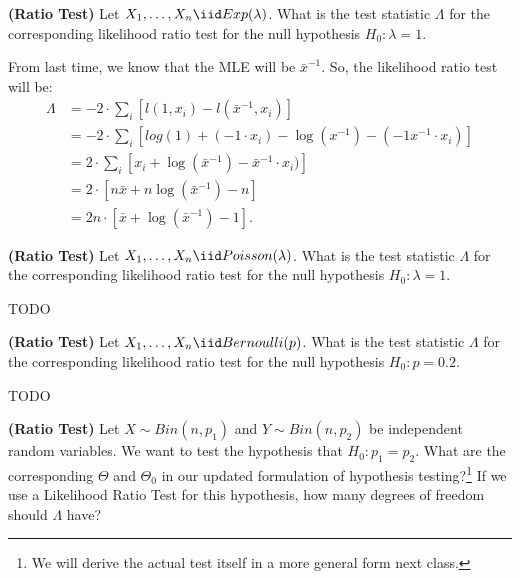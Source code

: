 
\textbf{(Ratio Test)} Let $X_1, \ldots, X_n \iid Exp(\lambda)$.
What is the test statistic $\Lambda$ for the corresponding likelihood 
ratio test for the null hypothesis $H_0: \lambda = 1$.


From last time, we know that the MLE will be $\bar{x}^{-1}$. So, the likelihood
ratio test will be:
\begin{align*}
\Lambda &= -2 \cdot \sum_i \left[ l(1, x_i) - l(\bar{x}^{-1}, x_i) \right] \\
&= -2 \cdot \sum_i \left[ log(1) + (-1 \cdot x_i) - \log(x^{-1}) - (-1 x^{-1} \cdot x_i) \right] \\
&= 2 \cdot \sum_i \left[ x_i + \log(\bar{x}^{-1}) - \bar{x}^{-1} \cdot x_i) \right] \\
&= 2 \cdot \left[ n \bar{x} + n \log(\bar{x}^{-1}) - n \right] \\
&= 2n \cdot \left[ \bar{x} + \log(\bar{x}^{-1}) - 1 \right].
\end{align*}


\textbf{(Ratio Test)} Let $X_1, \ldots, X_n \iid Poisson(\lambda)$.
What is the test statistic $\Lambda$ for the corresponding likelihood 
ratio test for the null hypothesis $H_0: \lambda = 1$.


TODO


\textbf{(Ratio Test)} Let $X_1, \ldots, X_n \iid Bernoulli(p)$.
What is the test statistic $\Lambda$ for the corresponding likelihood 
ratio test for the null hypothesis $H_0: p = 0.2$.


TODO


\textbf{(Ratio Test)} Let $X \sim Bin(n, p_1)$ and $Y \sim Bin(n, p_2)$ be
independent random variables. We want to test the hypothesis that
$H_0: p_1 = p_2$. What are the corresponding $\Theta$ and $\Theta_0$ in
our updated formulation of hypothesis testing?\footnote{
  We will derive the actual test itself in a more general form next
  class.
} If we use a Likelihood Ratio Test for this hypothesis, how many degrees of
freedom should $\Lambda$ have?

